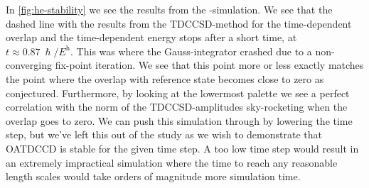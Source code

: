        In \autoref{fig:he-stability} we see the results from the
        -simulation.
        We see that the dashed line with the results from the TDCCSD-method for
        the time-dependent overlap and the time-dependent energy stops after a
        short time, at $t \approx \SI{0.87}{\hslash/\hartree}$.
        This was where the Gauss-integrator crashed due to a non-converging
        fix-point iteration.
        We see that this point more or less exactly matches the point where the
        overlap with reference state becomes close to zero as conjectured.
        Furthermore, by looking at the lowermost palette we see a perfect
        correlation with the norm of the TDCCSD-amplitudes sky-rocketing when
        the overlap goes to zero.
        We can push this simulation through by lowering the time step, but we've
        left this out of the study as we wish to demonstrate that OATDCCD is
        stable for the given time step.
        A too low time step would result in an extremely impractical simulation
        where the time to reach any reasonable length scales would take orders
        of magnitude more simulation time.
